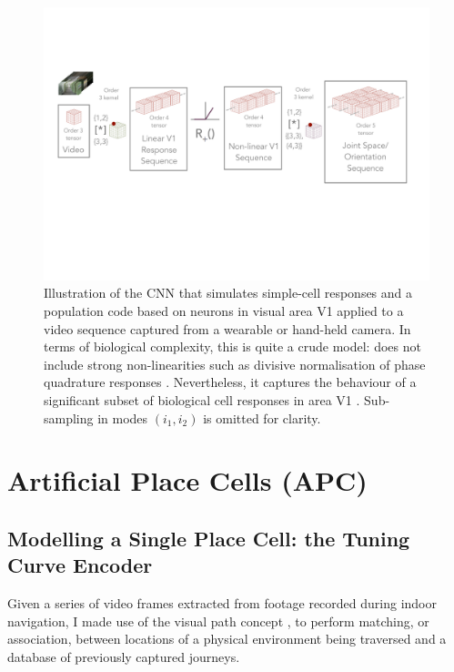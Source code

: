 \begin{figure}
\centering
\includegraphics[width=1.1\linewidth,trim={0 7cm 0 3cm},clip]{gfx/Chapter05/video_encoding_pipeline.pdf}
\caption{Illustration of the CNN that simulates simple-cell responses and a population code based on neurons in visual area V1 applied to a video sequence captured from a wearable or hand-held camera.  In terms of biological complexity, this is quite a crude model: does not include strong non\--linearities such as divisive normalisation of phase quadrature
responses \cite{petrou2008next}. Nevertheless, it captures the behaviour of a significant subset of biological cell responses in area V1 \cite{carandini1997predictions}. Sub-sampling in modes $(i_1,i_2)$ is omitted for clarity.}
\label{fig:arch}
\end{figure}

\section{Artificial Place Cells (APC)}

\subsection{Modelling a Single Place Cell: the Tuning Curve Encoder}

Given a series of video frames extracted from footage recorded during indoor navigation, I made use of the visual path concept \cite{RiveraWearable, matsumoto1996visual, ohno1996autonomous}, to perform  matching, or association, between locations of a physical environment being traversed and a database of previously captured journeys.

